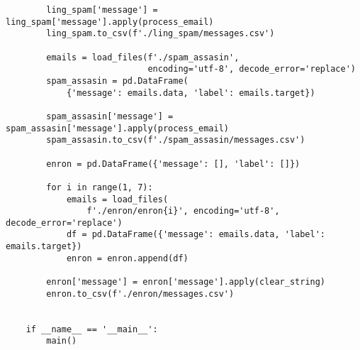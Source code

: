 \begin{lstlisting}
        ling_spam['message'] = ling_spam['message'].apply(process_email)
        ling_spam.to_csv(f'./ling_spam/messages.csv')
    
        emails = load_files(f'./spam_assasin',
                            encoding='utf-8', decode_error='replace')
        spam_assasin = pd.DataFrame(
            {'message': emails.data, 'label': emails.target})
    
        spam_assasin['message'] = spam_assasin['message'].apply(process_email)
        spam_assasin.to_csv(f'./spam_assasin/messages.csv')
    
        enron = pd.DataFrame({'message': [], 'label': []})
    
        for i in range(1, 7):
            emails = load_files(
                f'./enron/enron{i}', encoding='utf-8', decode_error='replace')
            df = pd.DataFrame({'message': emails.data, 'label': emails.target})
            enron = enron.append(df)
    
        enron['message'] = enron['message'].apply(clear_string)
        enron.to_csv(f'./enron/messages.csv')
    
    
    if __name__ == '__main__':
        main()
\end{lstlisting}

